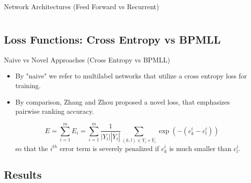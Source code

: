 \documentclass{beamer}
\begin{document}
\begin{frame}[t]{Network Architectures (Feed Forward vs Recurrent)}
\begin{columns}[t]
    \end{columns}
\end{frame}

\subsection{Loss Functions: Cross Entropy vs BPMLL}

\begin{frame}[t]{Naive vs Novel Approaches (Cross Entropy vs BPMLL)}
    \begin{itemize}
        \item 
        By "naive" we refer to multilabel networks that utilize a cross entropy loss for training.
        
        \item
        By comparison, Zhang and Zhou \autocite{bpmll} proposed a novel loss, that emphasizes pairwise ranking accuracy.
        
        $$
            E = \sum_{i = 1}^m E_i = \sum_{i = 1}^m \frac{1}{|Y_i| |\overline{Y}_i|} \sum_{(k,l) \in Y_i \times \overline{Y}_i} \exp(-(c_k^i - c_l^i))
        $$
        so that the $i^{th}$ error term is severely penalized if $c_k^i$ is much smaller than $c_l^i$.
    \end{itemize}
\end{frame}

\subsection{Results}
\end{document}
